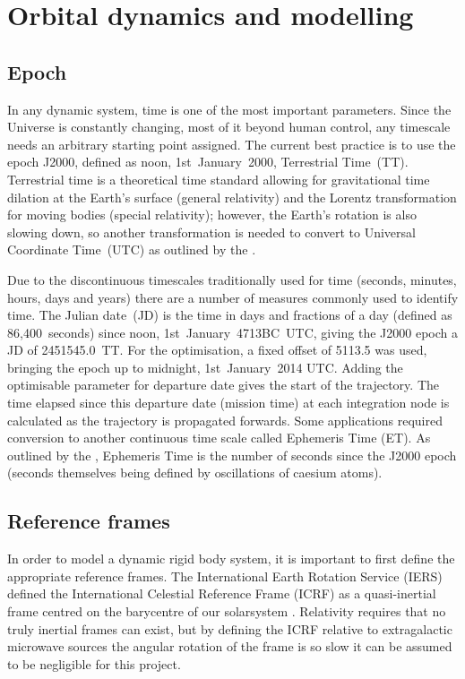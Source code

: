 \chapter{Orbital dynamics and modelling} \label{cha:Orbital-dynamics-and-modelling}

\section{Epoch} \label{sec:Epoch}

In any dynamic system, time is one of the most important parameters. Since the Universe is constantly changing, most of it beyond human control, any timescale needs an arbitrary starting point assigned. The current best practice is to use the epoch J2000, defined as noon, 1st~January~2000, Terrestrial Time~(TT). Terrestrial time is a theoretical time standard allowing for gravitational time dilation at the Earth's surface (general relativity) and the Lorentz transformation for moving bodies (special relativity); however, the Earth's rotation is also slowing down, so another transformation is needed to convert to Universal Coordinate Time~(UTC) as outlined by the \textcite[USNO, ][]{web_TimeServiceDept.2008}.

Due to the discontinuous timescales traditionally used for time (seconds, minutes, hours, days and years) there are a number of measures commonly used to identify time. The Julian date~(JD) is the time in days and fractions of a day (defined as 86,400~seconds) since noon, 1st~January~4713BC~UTC, giving the J2000 epoch a JD of 2451545.0~TT. For the optimisation, a fixed offset of 5113.5 was used, bringing the epoch up to midnight, 1st~January~2014 UTC. Adding the optimisable parameter for departure date gives the start of the trajectory. The time elapsed since this departure date (mission time) at each integration node is calculated as the trajectory is propagated forwards. Some applications required conversion to another continuous time scale called Ephemeris Time (ET). As outlined by the \textcite{NAIF2010}, Ephemeris Time is the number of seconds since the J2000 epoch (seconds themselves being defined by oscillations of caesium atoms).




\section{Reference frames} \label{sec:Reference-frames}

In order to model a dynamic rigid body system, it is important to first define the appropriate reference frames. The International Earth Rotation Service (IERS) defined the International Celestial Reference Frame (ICRF) as a quasi-inertial frame centred on the barycentre of our solarsystem \parencite{Ma1998}. %
Relativity requires that no truly inertial frames can exist, but by defining the ICRF relative to extragalactic microwave sources the angular rotation of the frame is so slow it can be assumed to be negligible for this project.

